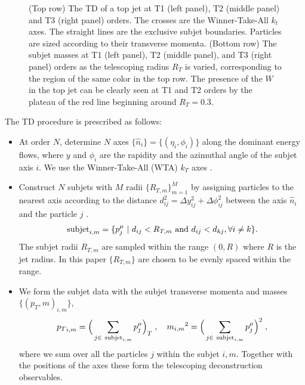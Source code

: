 \documentclass[notoc,preprintnumbers]{JHEP3}
\begin{document}
\begin{figure}[t]
\caption{\label{fig:tjet}(Top row) The TD of a top jet at T1 (left panel), T2 (middle panel) and T3 (right panel) orders. The crosses are the Winner-Take-All $k_t$ axes. The straight lines are the exclusive subjet boundaries. Particles are sized according to their transverse momenta. (Bottom row) The subjet masses at T1 (left panel), T2 (middle panel), and T3 (right panel) orders as the telescoping radius $R_T$ is varied, corresponding to the region of the same color in the top row. The presence of the $W$ in the top jet can be clearly seen at T1 and T2 orders by the plateau of the red line beginning around $R_T=0.3$.}
\end{figure}


The TD procedure is prescribed as follows:
\begin{itemize}
        \item At order $N$, determine $N$ axes $\{\hat n_i\}=\{(\eta_i,\phi_i)\}$ along the dominant energy flows, where $y$ and $\phi_i$ are the rapidity and the azimuthal angle of the subjet axis $i$. We use the Winner-Take-All (WTA) $k_T$ axes \cite{Bertolini:2013iqa}.
        \item Construct $N$ subjets with $M$ radii $\{R_{T,m}\}^M_{m=1}$ by assigning particles to the nearest axis according to the distance $d^2_{ij} = \Delta y_{ij}^2+\Delta \phi_{ij}^2$ between the axis $\hat n_i$ and the particle $j$ \cite{Stewart:2010tn,Chien:2013kca,Stewart:2015waa,Thaler:2015xaa}.
            \begin{equation}
                {\rm subjet}_{i,m} = \{p^\mu_j~|~d_{ij}<R_{T,m}~{\rm and}~d_{ij}<d_{kj}, \forall i\neq k\}.
            \end{equation}
            The subjet radii ${R_{T,m}}$ are sampled within the range $(0,R)$ where $R$ is the jet radius. In this paper $\{R_{T,m}\}$ are chosen to be evenly spaced within the range.
        \item We form the subjet data with the subjet transverse momenta and masses $\{(p_T,m)_{i,m}\}$,
            \begin{equation}
                {p_T}_{i,m}=\Big(\sum_{j\in~{\rm subjet}_{i,m}}p^\mu_j\Big)_T\;,~~~{m_{i,m}}^2=\Big(\sum_{j\in~{\rm subjet}_{i,m}}p^\mu_j\Big)^2\;,
            \end{equation}
            where we sum over all the particles $j$ within the subjet $i,m$. Together with the positions of the axes these form the telescoping deconstruction observables.
    \end{itemize}
\end{document}
